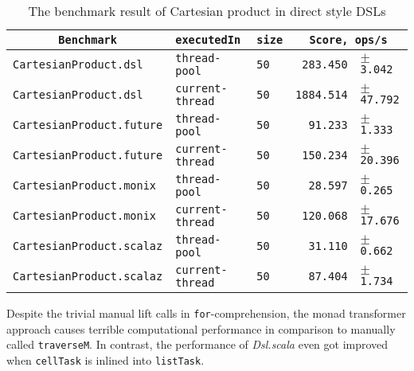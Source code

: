 \begin{table}[htbp]
  \begin{tabular}{l|l|l|rl}
   \multicolumn{1}{c|}{\texttt{Benchmark}} & \texttt{executedIn} & \texttt{size} & \multicolumn{2}{c}{\texttt{Score, ops/s}} \\
  \hline
  \texttt{CartesianProduct.dsl} & \texttt{thread-pool} & \texttt{50} & \texttt{283.450} & \scriptsize $\pm$ \texttt{3.042}  \\
  \texttt{CartesianProduct.dsl} & \texttt{current-thread} & \texttt{50} & \texttt{1884.514} & \scriptsize $\pm$ \texttt{47.792}  \\
  \texttt{CartesianProduct.future} & \texttt{thread-pool} & \texttt{50} & \texttt{91.233} & \scriptsize $\pm$ \texttt{1.333}  \\
  \texttt{CartesianProduct.future} & \texttt{current-thread} & \texttt{50} & \texttt{150.234} & \scriptsize $\pm$ \texttt{20.396}  \\
  \texttt{CartesianProduct.monix} & \texttt{thread-pool} & \texttt{50} & \texttt{28.597} & \scriptsize $\pm$ \texttt{0.265}  \\
  \texttt{CartesianProduct.monix} & \texttt{current-thread} & \texttt{50} & \texttt{120.068} & \scriptsize $\pm$ \texttt{17.676}  \\
  \texttt{CartesianProduct.scalaz} & \texttt{thread-pool} & \texttt{50} & \texttt{31.110} & \scriptsize $\pm$ \texttt{0.662}  \\
  \texttt{CartesianProduct.scalaz} & \texttt{current-thread} & \texttt{50} & \texttt{87.404} & \scriptsize $\pm$ \texttt{1.734}  \\
  \end{tabular}
  \caption{The benchmark result of Cartesian product in direct style DSLs}
  \label{CartesianProduct}
\end{table}

Despite the trivial manual lift calls in \lstinline{for}-comprehension, the monad transformer approach causes terrible computational performance in comparison to manually called \lstinline{traverseM}. In contrast, the performance of \textit{Dsl.scala} even got improved when \lstinline{cellTask} is inlined into \lstinline{listTask}.
